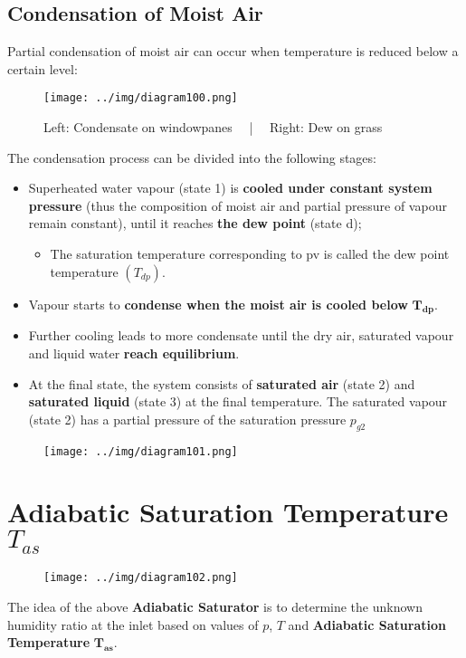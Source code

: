 \documentclass[class=report, crop=false, 12pt,a4paper]{standalone}
\numberwithin{equation}{section}
\begin{document}
\subsection{Condensation of Moist Air}
Partial condensation of moist air can occur when temperature is reduced below a certain level:
\begin{figure}[H]
  \centering
  \texttt{[image: ../img/diagram100.png]}
  \caption{Left: Condensate on windowpanes \ \ | \ \ Right: Dew on grass}
\end{figure}
The condensation process can be divided into the following stages:
\begin{itemize}[noitemsep]
  \item Superheated water vapour (state 1) is \textbf{cooled under constant system pressure} (thus the composition of moist air and partial pressure of vapour remain constant), until it reaches \textbf{the dew point} (state d);
  \begin{itemize}[noitemsep]
    \item The saturation temperature corresponding to pv is called the dew point temperature $(T_{dp})$.
  \end{itemize}
  \item Vapour starts to \textbf{condense when the moist air is cooled below} $\mathbf{T_{dp}}$.
  \item Further cooling leads to more condensate until the dry air, saturated vapour and liquid water \textbf{reach equilibrium}.
  \item At the final state, the system consists of \textbf{saturated air} (state 2) and \textbf{saturated liquid} (state 3) at the final temperature. The saturated vapour (state 2) has a partial pressure of the saturation pressure $p_{g2}$
\end{itemize}
\begin{figure}[H]
  \centering
  \texttt{[image: ../img/diagram101.png]}
  \caption{}
\end{figure}
\section{Adiabatic Saturation Temperature $T_{as}$}
\begin{figure}[H]
  \centering
  \texttt{[image: ../img/diagram102.png]}
  \caption{}
\end{figure}
The idea of the above \textbf{Adiabatic Saturator} is to determine the unknown humidity ratio at the inlet based on values of $p$, $T$ and \textbf{Adiabatic Saturation Temperature} $\mathbf{T_{as}}$.
\end{document}
